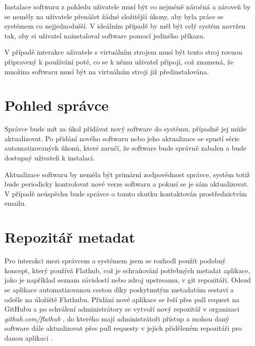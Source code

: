 \documentclass[
  digital,     %
  oneside,     %
  nosansbold,  %
  nocolorbold, %
  lof,         %
  lot,         %
]{fithesis4}
\begin{document}
Instalace softwaru z pohledu uživatele musí být co nejméně náročná a zároveň
by se neměly na uživatele přenášet žádné složitější úkony, aby byla práce
se systémem co nejjednodušší. V ideálním případě by měl být celý systém
navržen tak, aby si uživatel nainstaloval software pomocí jediného příkazu.

V případě interakce uživatele s virtuálním strojem musí být tento stroj rovnou
připravený k používání poté, co se k němu uživatel připojí, což znamená, že
množina softwaru musí být na virtuálním stroji již předinstalována.


\section{Pohled správce}

Správce bude mít za úkol přidávat nový software do systému, případně jej
může aktualizovat. Po přidání nového softwaru nebo jeho aktualizace se
spustí série automatizovaných úkonů, které zaručí, že software bude
správně zabalen a bude dostupný uživateli k instalaci.

Aktualizace softwaru by neměla být primární zodpovědnost správce, systém
totiž bude periodicky kontrolovat nové verze softwaru a pokusí se je
sám aktualizovat. V případě neúspěchu bude správce o tomto skutku
kontaktován prostřednictvím emailu.


\section{Repozitář metadat}

Pro interakci mezi správcem a systémem jsem se rozhodl použít podobný
koncept, který používá Flathub, což je schraňování potřebných metadat
aplikace, jako je například seznam závislostí nebo zdroj upstreamu, v
git repozitáři. Odsud se aplikace automatizovanou cestou díky
poskytnutým metadatům sestaví a odešle na úložiště Flathubu.
Přidání nové aplikace se řeší přes pull request na GitHubu 
a po schválení administrátory se vytvoří nový repozitář v organizaci
\textit{github.com/flathub}
\cite{flatpak_app_creation, flatpak_app_repo, flatpak_app_build}, do
kterého mají administrátoři přístup a mohou daný software dále
aktualizovat přes pull requesty v jejich přiděleném repozitáři pro
danou aplikaci \cite{flatpak_app_update}.
\end{document}
